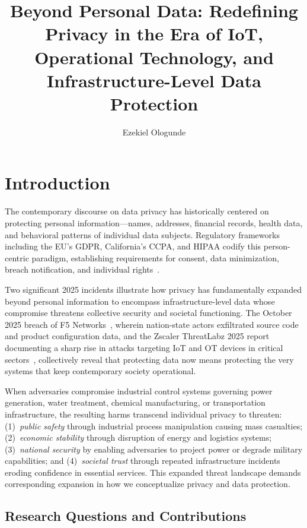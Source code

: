 \documentclass[sigconf,nonacm]{acmart}
\title{Beyond Personal Data: Redefining Privacy in the Era of IoT, Operational
Technology, and Infrastructure-Level Data Protection}
\author{Ezekiel Ologunde}
\affiliation{\institution{Independent Researcher}\city{Boston}\state{MA}\country{USA}}
\begin{document}
\maketitle

\section{Introduction}

The contemporary discourse on data privacy has historically centered on protecting
personal information---names, addresses, financial records, health data, and behavioral
patterns of individual data subjects. Regulatory frameworks including the EU's GDPR,
California's CCPA, and HIPAA codify this person-centric paradigm, establishing
requirements for consent, data minimization, breach notification, and individual
rights~\cite{voigt2021gdpr}.

Two significant 2025 incidents illustrate how privacy has fundamentally expanded beyond
personal information to encompass infrastructure-level data whose compromise threatens
collective security and societal functioning. The October 2025 breach of F5
Networks~\cite{vincen2025f5,soper2025f5}, wherein nation-state actors exfiltrated source
code and product configuration data, and the Zscaler ThreatLabz 2025 report documenting
a sharp rise in attacks targeting IoT and OT devices in critical
sectors~\cite{zscaler2025threat}, collectively reveal that protecting data now means
protecting the very systems that keep contemporary society operational.

When adversaries compromise industrial control systems governing power generation, water
treatment, chemical manufacturing, or transportation infrastructure, the resulting harms
transcend individual privacy to threaten: (1)~\emph{public safety} through industrial
process manipulation causing mass casualties; (2)~\emph{economic stability} through
disruption of energy and logistics systems; (3)~\emph{national security} by enabling
adversaries to project power or degrade military capabilities; and (4)~\emph{societal
trust} through repeated infrastructure incidents eroding confidence in essential
services. This expanded threat landscape demands corresponding expansion in how we
conceptualize privacy and data protection.

\subsection{Research Questions and Contributions}
\end{document}
